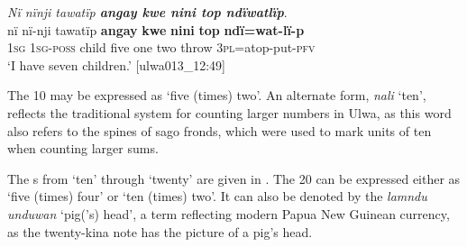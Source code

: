 \ea%
    \label{ex:det:220}
          \textit{Nï nïnji tawatïp \textbf{angay kwe nini top ndïwatlïp}}.\\
\gll nï    nï-nji    tawatïp    \textbf{angay}  \textbf{kwe}   \textbf{nini}  \textbf{top} \textbf{ndï=wat-lï-p}\\
    1\textsc{sg}  1\textsc{sg-poss}  child    five  one    two  throw    \textsc{3pl}=atop-put-\textsc{pfv}\\
\glt ‘I have seven children.’ [ulwa013\_12:49]
\z

The  10 may be expressed as ‘five (times) two’. An alternate form, \textit{nali} ‘ten’, reflects the traditional system for counting larger numbers in Ulwa, as this word also refers to the spines of sago fronds, which were used to mark units of ten when counting larger sums.

The s from ‘ten’ through ‘twenty’ are given in . The  20 can be expressed either as ‘five (times) four’ or ‘ten (times) two’. It can also be denoted by the  \textit{lamndu unduwan} ‘pig(’s) head’, a term reflecting modern Papua New Guinean currency, as the twenty-kina note has the picture of a pig’s head.

